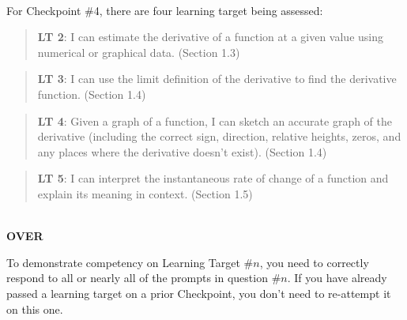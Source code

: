 \documentclass[11 pt]{article}
\begin{document}
\noindent \hrulefill \\

 For Checkpoint \#4, there are four learning target being assessed: 

\begin{quote}
{\bf LT 2}: I can estimate the derivative of a function at a given value using numerical or graphical data. 
(Section 1.3)
\end{quote}

\begin{quote}
{\bf LT 3}: I can use the limit definition of the derivative to find the derivative function. (Section 1.4) 
\end{quote}

\begin{quote}
{\bf LT 4}: Given a graph of a function, I can sketch an accurate graph of the derivative (including the correct sign, direction, relative heights, zeros, and any places where the derivative doesn’t exist). (Section 1.4) 
\end{quote}

\begin{quote}
{\bf LT 5}:  I can interpret the instantaneous rate of change of a function and explain its meaning in context.  (Section 1.5)
\end{quote}


\noindent \hrulefill \\

\vfill \hfill {\bf OVER} 

\pagebreak


\noindent To demonstrate competency on Learning Target \#$n$, you need to correctly respond to all or nearly all of the prompts in question \#$n$.  If you have already passed a learning target on a prior Checkpoint, you don't need to re-attempt it on this one.
  
\end{document}
